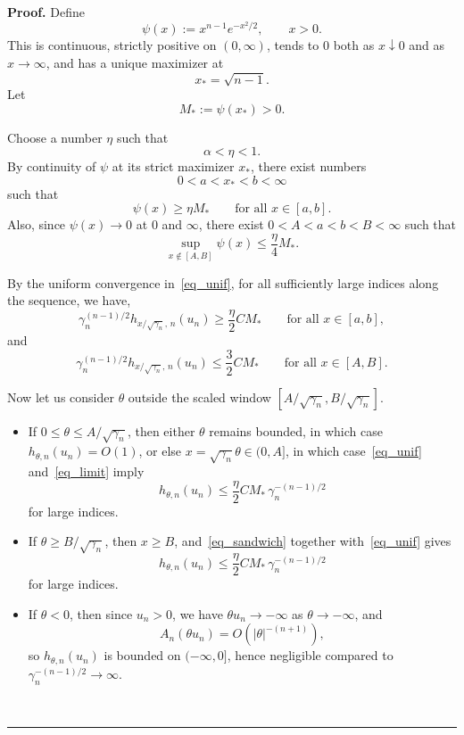 \documentclass{article}%
\newenvironment{proof}[1][Proof]{\noindent\textbf{#1.} }{\ \rule{0.5em}{0.5em}}
\begin{document}
\begin{proof}
Define
\[
\psi(x):=x^{n-1}e^{-x^2/2},\qquad x>0.
\]
This is continuous, strictly positive on \((0,\infty)\), tends to \(0\) both as \(x\downarrow0\) and as \(x\to\infty\), and has a unique maximizer at
\[
x_*=\sqrt{n-1}.
\]
Let
\[
M_*:=\psi(x_*)>0.
\]

Choose a number \(\eta\) such that
\[
\alpha<\eta<1.
\]
By continuity of \(\psi\) at its strict maximizer \(x_*\), there exist numbers
\[
0<a<x_*<b<\infty
\]
such that
\[
\psi(x)\ge \eta M_*
\qquad\text{for all }x\in[a,b].
\]
Also, since \(\psi(x)\to0\) at \(0\) and \(\infty\), there exist \(0<A<a<b<B<\infty\) such that
\begin{equation}\label{eq_limit}
\sup_{x\notin[A,B]}\psi(x)\le \frac{\eta}{4}M_*.
\end{equation}

By the uniform convergence in~\eqref{eq_unif}, for all sufficiently large indices along the sequence, we have,
\begin{equation}\label{eq_lim_lower}
\gamma_n^{(n-1)/2} h_{x/\sqrt{\gamma_n},\,n}(u_n)
\ge \frac{\eta}{2} C M_*
\qquad\text{for all }x\in[a,b],
\end{equation}
and
\begin{equation}\label{eq_lim_upper}
\gamma_n^{(n-1)/2} h_{x/\sqrt{\gamma_n},\,n}(u_n)
\le \frac{3}{2} C M_*
\qquad\text{for all }x\in[A,B].
\end{equation}

Now let us consider \(\theta\) outside the scaled window \([A/\sqrt{\gamma_n},B/\sqrt{\gamma_n}]\).

\begin{itemize}
\item If \(0\le \theta \le A/\sqrt{\gamma_n}\), then either \(\theta\) remains bounded, in which case \(h_{\theta,n}(u_n)=O(1)\), or else \(x=\sqrt{\gamma_n}\theta\in(0,A]\), in which case~\eqref{eq_unif} and~\eqref{eq_limit} imply
\[
h_{\theta,n}(u_n)\le \frac{\eta}{2} C M_*\,\gamma_n^{-(n-1)/2}
\]
for large indices.

\item If \(\theta \ge B/\sqrt{\gamma_n}\), then \(x\ge B\), and~\eqref{eq_sandwich} together with~\eqref{eq_unif} gives
\[
h_{\theta,n}(u_n)\le \frac{\eta}{2} C M_*\,\gamma_n^{-(n-1)/2}
\]
for large indices.

\item If \(\theta<0\), then since \(u_n>0\), we have \(\theta u_n\to -\infty\) as \(\theta\to-\infty\), and 
\[
A_n(\theta u_n)=O(|\theta|^{-(n+1)}),
\]
so \(h_{\theta,n}(u_n)\) is bounded on \((-\infty,0]\), hence negligible compared to \(\gamma_n^{-(n-1)/2}\to\infty\).
\end{itemize}


\end{proof}
\end{document}
